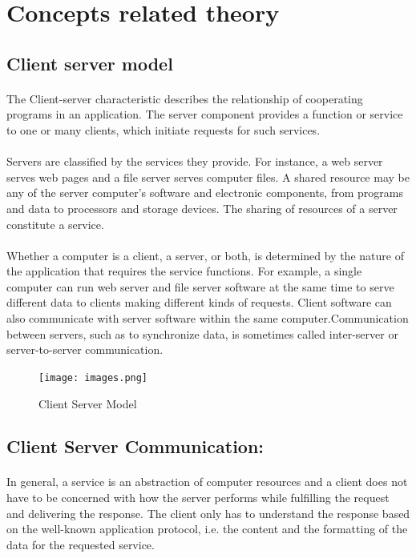 \documentclass[10pt,a4paper]{article}
\begin{document}
\section{Concepts related theory}
\subsection{Client server model}
	\paragraph{} The Client-server characteristic describes the relationship of cooperating programs in an application. The server component provides a function or service to one or many clients, which initiate requests for such services.
	\paragraph{}Servers are classified by the services they provide. For instance, a web server serves web pages and a file server serves computer files. A shared resource may be any of the server computer's software and electronic components, from programs and data to processors and storage devices. The sharing of resources of a server constitute a service.
	\paragraph{} Whether a computer is a client, a server, or both, is determined by the nature of the application that requires the service functions. For example, a single computer can run web server and file server software at the same time to serve different data to clients making different kinds of requests. Client software can also communicate with server software within the same computer.Communication between servers, such as to synchronize data, is sometimes called inter-server or server-to-server communication.
		
		\begin{figure}[htb!]
			\centering
			\texttt{[image: images.png]}
			\caption{Client Server Model}
			\label{Client Server Model}
		\end{figure}
		
\subsection{Client Server Communication:}
	\paragraph{} In general, a service is an abstraction of computer resources and a client does not have to be concerned with how the server performs while fulfilling the request and delivering the response. The client only has to understand the response based on the well-known application protocol, i.e. the content and the formatting of the data for the requested service.
\end{document}
